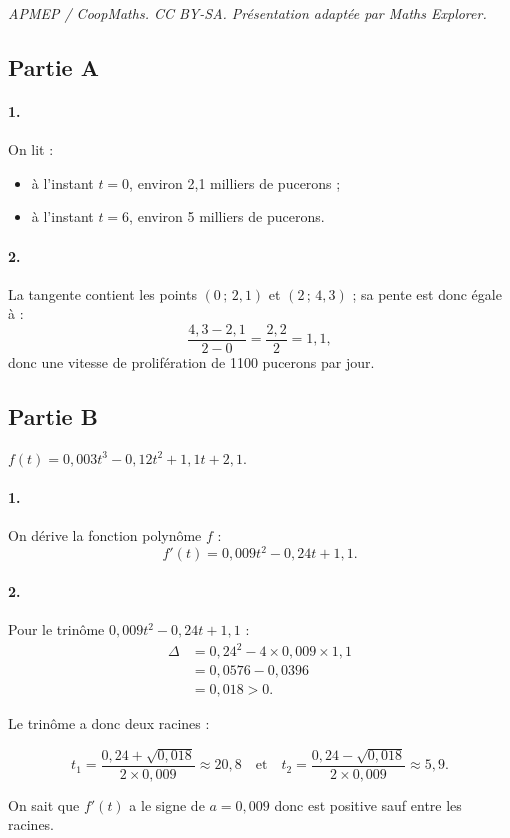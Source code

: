 \documentclass[10pt]{article}
\begin{document}
\noindent\textit{APMEP / CoopMaths. CC BY-SA. Présentation adaptée par Maths Explorer.}\par\medskip
\subsection*{Partie A}

\paragraph{1.}
On lit :
\begin{itemize}
    \item à l'instant \( t = 0 \), environ 2{,}1 milliers de pucerons ;
    \item à l'instant \( t = 6 \), environ 5 milliers de pucerons.
\end{itemize}

\paragraph{2.}
La tangente contient les points \( (0\,;\,2{,}1) \) et \( (2\,;\,4{,}3) \) ; sa pente est donc égale à :
\[
\dfrac{4{,}3 - 2{,}1}{2 - 0} = \dfrac{2{,}2}{2} = 1{,}1,
\]
donc une vitesse de prolifération de 1100 pucerons par jour.

\subsection*{Partie B}

\(f(t) = 0{,}003t^3 - 0{,}12t^2 + 1{,}1t + 2{,}1\).

\paragraph{1.}
On dérive la fonction polynôme \( f \) :
\[
f'(t) = 0{,}009t^2 - 0{,}24t + 1{,}1.
\]

\paragraph{2.}
Pour le trinôme \( 0{,}009t^2 - 0{,}24t + 1{,}1 \) :
\begin{align*}
\Delta &= 0{,}24^2 - 4 \times 0{,}009 \times 1{,}1 \\
&= 0{,}0576 - 0{,}0396 \\
&= 0{,}018 > 0.
\end{align*}

Le trinôme a donc deux racines :

\[
t_1 = \dfrac{0{,}24 + \sqrt{0{,}018}}{2 \times 0{,}009} \approx 20{,}8 \quad \text{et} \quad t_2 = \dfrac{0{,}24 - \sqrt{0{,}018}}{2 \times 0{,}009} \approx 5{,}9.
\]

On sait que \( f'(t) \) a le signe de \( a = 0{,}009 \) donc est positive sauf entre les racines.
\end{document}

